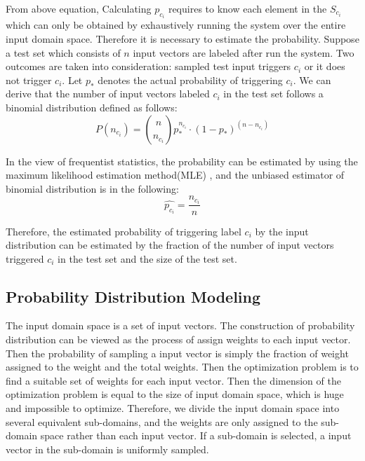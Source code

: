 \documentclass[conference]{IEEEtran}
\begin{document}
From above equation, Calculating \(p_{c_{i}}\) requires to know each element in the \(S_{c_{i}}\) which can only be obtained by exhaustively running the system over the entire input domain space. Therefore it is necessary to estimate the probability.
Suppose a test set which consists of \(n\) input vectors are labeled after run the system. Two outcomes are taken into consideration: sampled test input triggers \(c_{i}\) or it does not trigger \(c_{i}\). Let \(p_{*}\) denotes the actual probability of triggering \(c_{i}\). We can derive that the number of input vectors labeled \(c_{i}\) in the test set follows a binomial distribution defined as follows:
\[P(n_{c_{i}}) = \binom{n}{n_{c_{i}}}p_{*}^{n_{c_{i}}}\cdot (1-p_{*})^{(n-n_{c_{i}})} \]

In the view of frequentist statistics, the probability can be estimated by using the maximum likelihood estimation method(MLE) \cite{mle}, and the unbiased estimator of binomial distribution is in the following:
\[ \label{eq:estp}
\tag{5}
\hat{p_{c_i}} = \frac{n_{c_i}}{n}\]

Therefore, the estimated probability of triggering label \(c_i\) by the input distribution can be estimated by the fraction of the number of input vectors triggered \(c_i\) in the test set and the size of the test set.
\subsection{Probability Distribution Modeling}
The input domain space is a set of input vectors. The construction of probability distribution can be viewed as the process of assign weights to each input vector. Then the probability of sampling a input vector is simply the fraction of weight assigned to the weight and the total weights.
Then the optimization problem is to find a suitable set of weights for each input vector. Then the dimension of the optimization problem is equal to the size of input domain space, which is huge and impossible to optimize. Therefore, we divide the input domain space into several equivalent sub-domains, and the weights are only assigned to the sub-domain space rather than each input vector. If a sub-domain is selected, a input vector in the sub-domain is uniformly sampled.
\end{document}
